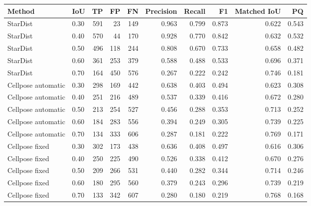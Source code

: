 \begin{tabular}{llrrrrrrrr}
\toprule
Method & IoU & TP & FP & FN & Precision & Recall & F1 & Matched IoU & PQ \\
\midrule
StarDist & 0.30 & 591 & 23 & 149 & 0.963 & 0.799 & 0.873 & 0.622 & 0.543 \\
StarDist & 0.40 & 570 & 44 & 170 & 0.928 & 0.770 & 0.842 & 0.632 & 0.532 \\
StarDist & 0.50 & 496 & 118 & 244 & 0.808 & 0.670 & 0.733 & 0.658 & 0.482 \\
StarDist & 0.60 & 361 & 253 & 379 & 0.588 & 0.488 & 0.533 & 0.696 & 0.371 \\
StarDist & 0.70 & 164 & 450 & 576 & 0.267 & 0.222 & 0.242 & 0.746 & 0.181 \\
\addlinespace
Cellpose automatic & 0.30 & 298 & 169 & 442 & 0.638 & 0.403 & 0.494 & 0.623 & 0.308 \\
Cellpose automatic & 0.40 & 251 & 216 & 489 & 0.537 & 0.339 & 0.416 & 0.672 & 0.280 \\
Cellpose automatic & 0.50 & 213 & 254 & 527 & 0.456 & 0.288 & 0.353 & 0.713 & 0.252 \\
Cellpose automatic & 0.60 & 184 & 283 & 556 & 0.394 & 0.249 & 0.305 & 0.739 & 0.225 \\
Cellpose automatic & 0.70 & 134 & 333 & 606 & 0.287 & 0.181 & 0.222 & 0.769 & 0.171 \\
\addlinespace
Cellpose fixed & 0.30 & 302 & 173 & 438 & 0.636 & 0.408 & 0.497 & 0.616 & 0.306 \\
Cellpose fixed & 0.40 & 250 & 225 & 490 & 0.526 & 0.338 & 0.412 & 0.670 & 0.276 \\
Cellpose fixed & 0.50 & 209 & 266 & 531 & 0.440 & 0.282 & 0.344 & 0.714 & 0.246 \\
Cellpose fixed & 0.60 & 180 & 295 & 560 & 0.379 & 0.243 & 0.296 & 0.739 & 0.219 \\
Cellpose fixed & 0.70 & 133 & 342 & 607 & 0.280 & 0.180 & 0.219 & 0.768 & 0.168 \\
\bottomrule
\end{tabular}
